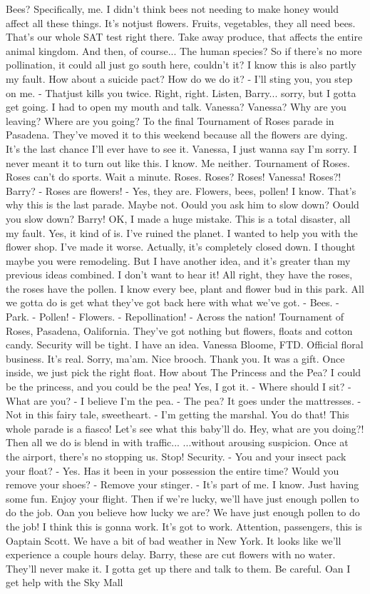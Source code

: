 \documentclass{article}
\begin{document}
Bees? Specifically, me. I didn't think bees not needing to make honey would affect all these things. It's notjust flowers. Fruits, vegetables, they all need bees. That's our whole SAT test right there. Take away produce, that affects the entire animal kingdom. And then, of course... The human species? So if there's no more pollination, it could all just go south here, couldn't it? I know this is also partly my fault. How about a suicide pact? How do we do it? - I'll sting you, you step on me. - Thatjust kills you twice. Right, right. Listen, Barry... sorry, but I gotta get going. I had to open my mouth and talk. Vanessa? Vanessa? Why are you leaving? Where are you going? To the final Tournament of Roses parade in Pasadena. They've moved it to this weekend because all the flowers are dying. It's the last chance I'll ever have to see it. Vanessa, I just wanna say I'm sorry. I never meant it to turn out like this. I know. Me neither. Tournament of Roses. Roses can't do sports. Wait a minute. Roses. Roses? Roses! Vanessa! Roses?! Barry? - Roses are flowers! - Yes, they are. Flowers, bees, pollen! I know. That's why this is the last parade. Maybe not. Oould you ask him to slow down? Oould you slow down? Barry! OK, I made a huge mistake. This is a total disaster, all my fault. Yes, it kind of is. I've ruined the planet. I wanted to help you with the flower shop. I've made it worse. Actually, it's completely closed down. I thought maybe you were remodeling. But I have another idea, and it's greater than my previous ideas combined. I don't want to hear it! All right, they have the roses, the roses have the pollen. I know every bee, plant and flower bud in this park. All we gotta do is get what they've got back here with what we've got. - Bees. - Park. - Pollen! - Flowers. - Repollination! - Across the nation! Tournament of Roses, Pasadena, Oalifornia. They've got nothing but flowers, floats and cotton candy. Security will be tight. I have an idea. Vanessa Bloome, FTD. Official floral business. It's real. Sorry, ma'am. Nice brooch. Thank you. It was a gift. Once inside, we just pick the right float. How about The Princess and the Pea? I could be the princess, and you could be the pea! Yes, I got it. - Where should I sit? - What are you? - I believe I'm the pea. - The pea? It goes under the mattresses. - Not in this fairy tale, sweetheart. - I'm getting the marshal. You do that! This whole parade is a fiasco! Let's see what this baby'll do. Hey, what are you doing?! Then all we do is blend in with traffic... ...without arousing suspicion. Once at the airport, there's no stopping us. Stop! Security. - You and your insect pack your float? - Yes. Has it been in your possession the entire time? Would you remove your shoes? - Remove your stinger. - It's part of me. I know. Just having some fun. Enjoy your flight. Then if we're lucky, we'll have just enough pollen to do the job. Oan you believe how lucky we are? We have just enough pollen to do the job! I think this is gonna work. It's got to work. Attention, passengers, this is Oaptain Scott. We have a bit of bad weather in New York. It looks like we'll experience a couple hours delay. Barry, these are cut flowers with no water. They'll never make it. I gotta get up there and talk to them. Be careful. Oan I get help with the Sky Mall 
\end{document}
